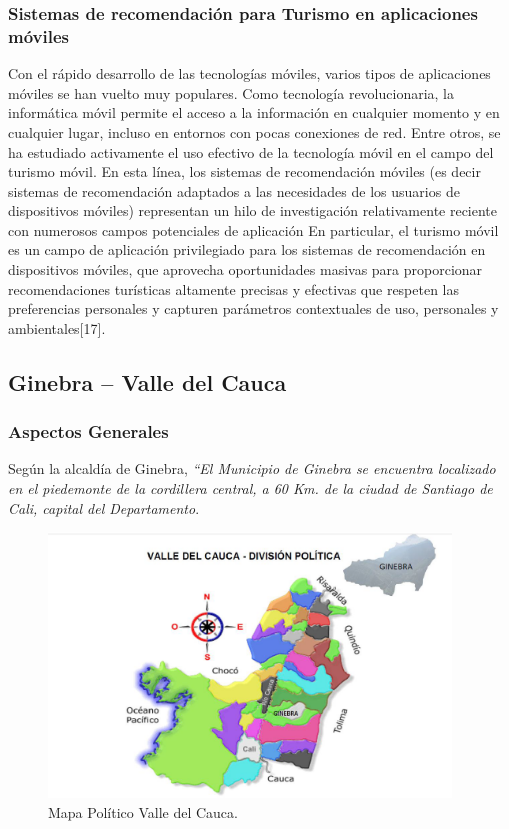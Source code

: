 \documentclass[12pt,letterpaper,openany]{book}
\begin{document}
\subsubsection{Sistemas de recomendación para Turismo en aplicaciones móviles}
Con el rápido desarrollo de las tecnologías móviles, varios tipos de aplicaciones móviles se han vuelto muy populares. Como tecnología revolucionaria, la informática móvil permite el acceso a la información en cualquier momento y en cualquier lugar, incluso en entornos con pocas conexiones de red. Entre otros, se ha estudiado activamente el uso efectivo de la tecnología móvil en el campo del turismo móvil. En esta línea, los sistemas de recomendación móviles (es decir sistemas de recomendación adaptados a las necesidades de los usuarios de dispositivos móviles) representan un hilo de investigación relativamente reciente con numerosos campos potenciales de aplicación  En particular, el turismo móvil es un campo de aplicación privilegiado para los sistemas de recomendación en dispositivos móviles, que aprovecha oportunidades masivas para proporcionar recomendaciones turísticas altamente precisas y efectivas que respeten las preferencias personales y capturen parámetros contextuales de uso, personales y ambientales[17]. 

\subsection{Ginebra – Valle del Cauca}
\subsubsection{Aspectos Generales}
Según la alcaldía de Ginebra, \textit{“El Municipio de Ginebra se encuentra localizado en el piedemonte de la cordillera central, a 60 Km. de la ciudad de Santiago de Cali, capital del Departamento}.

\begin{figure}[H]
\begin{center}
\includegraphics[width=10.7cm]{./imagenes/mapa_politico}
\caption{Mapa Político Valle del Cauca.}
\end{center}
\end{figure}
\end{document}
